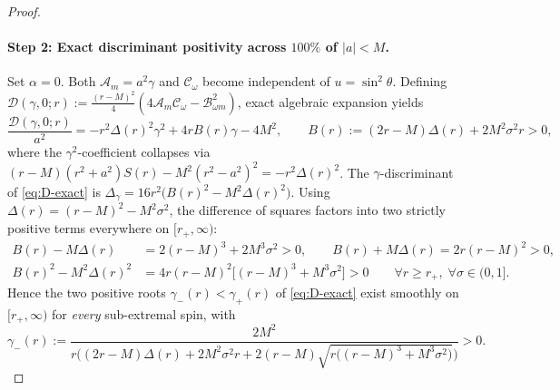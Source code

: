 \documentclass[11pt, a4paper]{article}
\theoremstyle{remark}
\begin{document}
\begin{proof}
\paragraph{Step 2: Exact discriminant positivity across $100\%$ of $|a| < M$.}
Set $\alpha = 0$. Both $\mathcal{A}_m = a^2\gamma$ and $\mathcal{C}_\omega$ become independent of $u = \sin^2\theta$. Defining $\mathcal{D}(\gamma, 0; r) := \frac{(r - M)^2}{4}(4\mathcal{A}_m\mathcal{C}_\omega - \mathcal{B}_{\omega m}^2)$, exact algebraic expansion yields
\begin{equation}
\label{eq:D-exact}
\frac{\mathcal{D}(\gamma, 0; r)}{a^2} = -r^2\Delta(r)^2\gamma^2 + 4r B(r)\gamma - 4M^2, \qquad B(r) := (2r - M)\Delta(r) + 2M^2\sigma^2 r > 0,
\end{equation}
where the $\gamma^2$-coefficient collapses via $(r - M)(r^2 + a^2)S(r) - M^2(r^2 - a^2)^2 = -r^2\Delta(r)^2$. The $\gamma$-discriminant of \eqref{eq:D-exact} is $\Delta_\gamma = 16r^2\big(B(r)^2 - M^2\Delta(r)^2\big)$. Using $\Delta(r) = (r - M)^2 - M^2\sigma^2$, the difference of squares factors into two strictly positive terms everywhere on $[r_+, \infty)$:
\begin{align}
B(r) - M\Delta(r) &= 2(r - M)^3 + 2M^3\sigma^2 > 0, \qquad B(r) + M\Delta(r) = 2r(r - M)^2 > 0, \\
B(r)^2 - M^2\Delta(r)^2 &= 4r(r - M)^2\big[(r - M)^3 + M^3\sigma^2\big] > 0 \qquad \forall r \ge r_+,\; \forall \sigma \in (0, 1]. \label{eq:B2-M2D2}
\end{align}
Hence the two positive roots $\gamma_-(r) < \gamma_+(r)$ of \eqref{eq:D-exact} exist smoothly on $[r_+, \infty)$ for \emph{every} sub-extremal spin, with
\begin{equation}
\label{eq:gamma-min}
\gamma_-(r) := \frac{2M^2}{r\Big((2r - M)\Delta(r) + 2M^2\sigma^2 r + 2(r - M)\sqrt{r\big((r - M)^3 + M^3\sigma^2\big)}\Big)} > 0.
\end{equation}


\end{proof}
\end{document}

